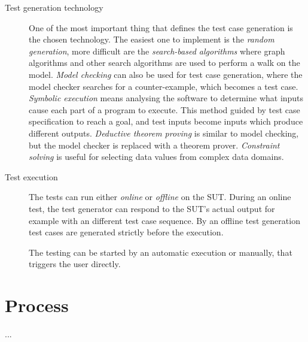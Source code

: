\begin{description}
	\item[Test generation technology] One of the most important thing that defines the test case generation is the chosen technology. The easiest one to implement is the \textit{random generation}, more difficult are the \textit{search-based algorithms} where graph algorithms and other search algorithms are used to perform a walk on the model. \textit{Model checking} can also be used for test case generation, where the model checker searches for a counter-example, which becomes a test case. \textit{Symbolic execution} means analysing the software to determine what inputs cause each part of a program to execute. This method guided by test case specification to reach a goal, and test inputs become inputs which produce different outputs. \textit{Deductive theorem proving} is similar to model checking, but the model checker is replaced with a theorem prover. \textit{Constraint solving} is useful for selecting data values from complex data domains.
	
	\item[Test execution] The tests can run either \textit{online} or \textit{offline} on the SUT. During an online test, the test generator can respond to the SUT's actual output for example with an different test case sequence. By an offline test generation test cases are generated strictly before the execution.
	
	The testing can be started by an automatic execution or manually, that triggers the user directly.
\end{description}


\section{Process}
\label{sec:process}

...


